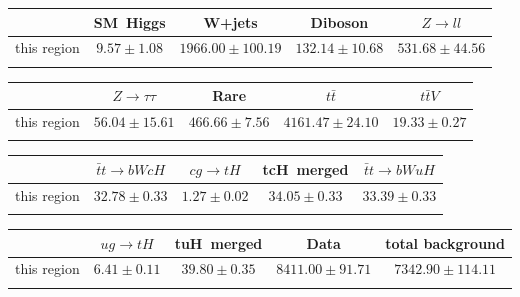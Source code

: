 \centering
\begin{tabular}{ccccc} \toprule\toprule
 & SM~Higgs & W+jets & Diboson & $Z\to ll$\\\midrule
this region & $9.57\pm1.08$ & $1966.00\pm100.19$ & $132.14\pm10.68$ & $531.68\pm44.56$\\
\bottomrule\bottomrule\\
\end{tabular}
\begin{tabular}{ccccc} \toprule\toprule
 & $Z\to \tau\tau$ & Rare & $t\bar{t}$ & $t\bar{t}V$\\\midrule
this region & $56.04\pm15.61$ & $466.66\pm7.56$ & $4161.47\pm24.10$ & $19.33\pm0.27$\\
\bottomrule\bottomrule\\
\end{tabular}
\begin{tabular}{ccccc} \toprule\toprule
 & $\bar{t}t\to bWcH$ & $cg\to tH$ & tcH~merged & $\bar{t}t\to bWuH$\\\midrule
this region & $32.78\pm0.33$ & $1.27\pm0.02$ & $34.05\pm0.33$ & $33.39\pm0.33$\\
\bottomrule\bottomrule\\
\end{tabular}
\begin{tabular}{ccccc} \toprule\toprule
 & $ug\to tH$ & tuH~merged & Data & total background\\\midrule
this region & $6.41\pm0.11$ & $39.80\pm0.35$ & $8411.00\pm91.71$ & $7342.90\pm114.11$\\
\bottomrule\bottomrule\\
\end{tabular}
